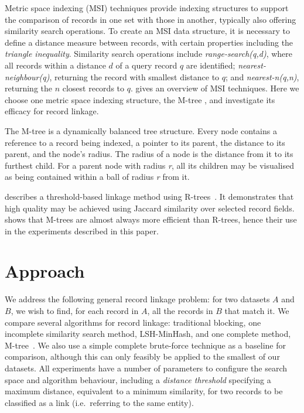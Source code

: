 \documentclass{llncs}
\begin{document}
Metric space indexing (MSI) techniques provide indexing structures to
support the comparison of records in one set with those in another,
typically also offering similarity search operations. To create an MSI
data structure, it is necessary to define a distance measure between
records, with certain properties including the \emph{triangle
inequality}. Similarity search operations include
\textit{range-search(q,d)}, where all records within a distance $d$ of a
query record $q$ are identified; \textit{nearest-neighbour(q)},
returning the record with smallest distance to $q$; and
\textit{nearest-n(q,n)}, returning the $n$ closest records to $q$.
\cite{Zezula2010} gives an overview of MSI techniques.
Here we choose one metric space indexing structure, the M-tree
\cite{paolociaccia2m}, and investigate its efficacy for record linkage.

The M-tree is a dynamically balanced tree structure. Every node contains
a reference to a record being indexed, a pointer to its parent, the
distance to its parent, and the node's radius. The radius of a node is
the distance from it to its furthest child. For a parent node with
radius \textit{r}, all its children may be visualised as being contained
within a ball of radius \textit{r} from it.

\cite{Li2006} describes a threshold-based linkage method using
R-trees~\cite{Hjaltason1998}. It demonstrates that high quality may be
achieved using Jaccard similarity over selected record fields.
\cite{Ciaccia97indexingmetric} shows that M-trees are almost always more
efficient than R-trees, hence their use in the experiments described in
this paper.


\section{Approach}
\label{sec-approach}

We address the following general record linkage problem: for two
datasets $A$ and $B$, we wish to find, for each record in $A$, all the
records in $B$ that match it. We compare several algorithms for record
linkage: traditional blocking, one incomplete similarity search method,
LSH-MinHash, and one complete method, M-tree~\cite{paolociaccia2m}. We
also use a simple complete brute-force technique as a baseline for
comparison, although this can only feasibly be applied to the smallest
of our datasets. All experiments have a number of parameters to
configure the search space and algorithm behaviour, including a
\emph{distance threshold} specifying a maximum distance, equivalent to a
minimum similarity, for two records to be classified as a link (i.e.\
referring to the same entity).
\end{document}
